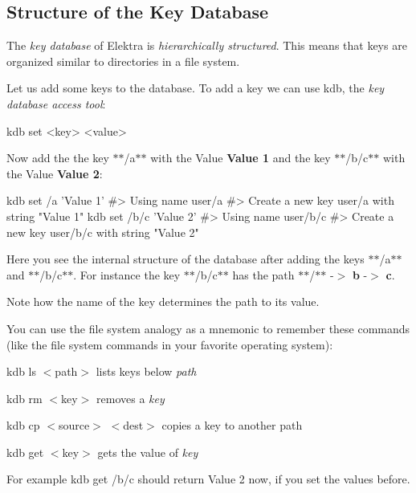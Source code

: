 \subsection*{Structure of the Key Database}

The {\itshape key database} of Elektra is {\itshape hierarchically structured}. This means that keys are organized similar to directories in a file system.

Let us add some keys to the database. To add a key we can use {\ttfamily kdb}, the {\itshape key database access tool}\+:


\begin{DoxyCode}
kdb set <key> <value>
\end{DoxyCode}


Now add the the key $\ast$$\ast$/a$\ast$$\ast$ with the Value {\bfseries Value 1} and the key $\ast$$\ast$/b/c$\ast$$\ast$ with the Value {\bfseries Value 2}\+:


\begin{DoxyCode}
kdb set /a 'Value 1'
#> Using name user/a
#> Create a new key user/a with string "Value 1"
kdb set /b/c 'Value 2'
#> Using name user/b/c
#> Create a new key user/b/c with string "Value 2"
\end{DoxyCode}




Here you see the internal structure of the database after adding the keys $\ast$$\ast$/a$\ast$$\ast$ and $\ast$$\ast$/b/c$\ast$$\ast$. For instance the key $\ast$$\ast$/b/c$\ast$$\ast$ has the path $\ast$$\ast$/$\ast$$\ast$ -\/$>$ {\bfseries b} -\/$>$ {\bfseries c}.

Note how the name of the key determines the path to its value.

You can use the file system analogy as a mnemonic to remember these commands (like the file system commands in your favorite operating system)\+:


\begin{DoxyItemize}
\item {\ttfamily kdb ls $<$path$>$} lists keys below {\itshape path}
\item {\ttfamily kdb rm $<$key$>$} removes a {\itshape key}
\item {\ttfamily kdb cp $<$source$>$ $<$dest$>$} copies a key to another path
\item {\ttfamily kdb get $<$key$>$} gets the value of {\itshape key}
\end{DoxyItemize}

For example {\ttfamily kdb get /b/c} should return {\ttfamily Value 2} now, if you set the values before.

